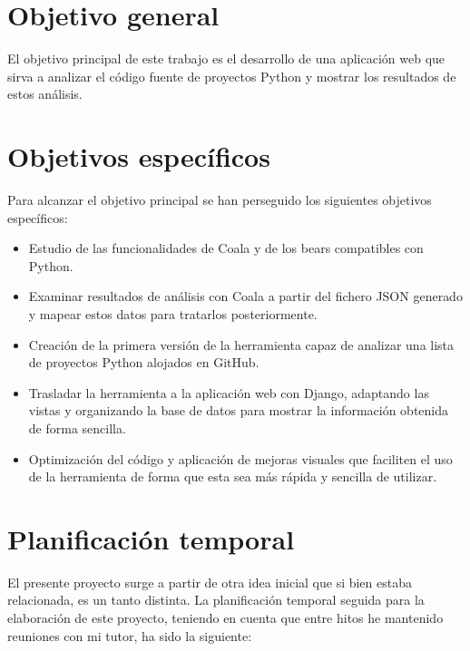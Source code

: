 \documentclass[a4paper, 12pt]{book}
\begin{document}
\section{Objetivo general}
\label{sec:objetivo-general}
El objetivo principal de este trabajo es el desarrollo de una aplicación web que sirva a analizar el código fuente de proyectos Python y mostrar los resultados de estos análisis.

\section{Objetivos específicos}
\label{sec:objetivos-especificos}
Para alcanzar el objetivo principal se han perseguido los siguientes objetivos específicos:
\begin{itemize}
  \item Estudio de las funcionalidades de Coala y de los bears compatibles con Python.
  \item Examinar resultados de análisis con Coala a partir del fichero JSON generado y mapear estos datos para tratarlos posteriormente.
  \item Creación de la primera versión de la herramienta capaz de analizar una lista de proyectos Python alojados en GitHub.
  \item Trasladar la herramienta a la aplicación web con Django, adaptando las vistas y organizando la base de datos para mostrar la información obtenida de forma sencilla.
  \item Optimización del código y aplicación de mejoras visuales que faciliten el uso de la herramienta de forma que esta sea más rápida y sencilla de utilizar.
\end{itemize}


\section{Planificación temporal}
\label{sec:planificacion-temporal}
El presente proyecto surge a partir de otra idea inicial que si bien estaba relacionada, es un tanto distinta. La planificación temporal seguida para la elaboración de este proyecto, teniendo en cuenta que entre hitos he mantenido reuniones con mi tutor, ha sido la siguiente:
\end{document}
